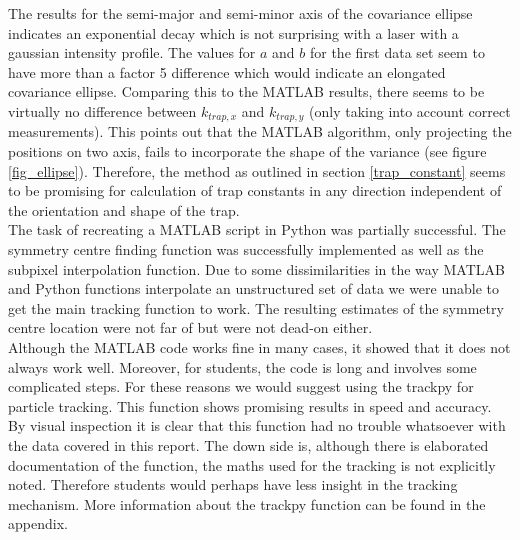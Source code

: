 The results for the semi-major and semi-minor axis of the covariance ellipse indicates an exponential decay which is not surprising with a laser with a gaussian intensity profile. The values for $a$ and $b$ for the first data set seem to have more than a factor 5 difference which would indicate an elongated covariance ellipse. Comparing this to the MATLAB results, there seems to be virtually no difference between $k_{trap,x}$ and $k_{trap,y}$ (only taking into account correct measurements). This points out that the MATLAB algorithm, only projecting the positions on two axis, fails to incorporate the shape of the variance (see figure \ref{fig_ellipse}). Therefore, the method as outlined in section \ref{trap_constant} seems to be promising for calculation of trap constants in any direction independent of the orientation and shape of the trap. \\
The task of recreating a MATLAB script in Python was partially successful. The symmetry centre finding function was successfully implemented as well as the subpixel interpolation function. Due to some dissimilarities in the way MATLAB and Python functions interpolate an unstructured set of data we were unable to get the main tracking function to work. The resulting estimates of the symmetry centre location were not far of but were not dead-on either. \\
Although the MATLAB code works fine in many cases, it showed that it does not always work well. Moreover, for students, the code is long and involves some complicated steps. For these reasons we would suggest using the trackpy for particle tracking. This function shows promising results in speed and accuracy. By visual inspection it is clear that this function had no trouble whatsoever with the data covered in this report. The down side is, although there is elaborated documentation of the function, the maths used for the tracking is not explicitly noted. Therefore students would perhaps have less insight in the tracking mechanism. More information about the trackpy function can be found in the appendix.
